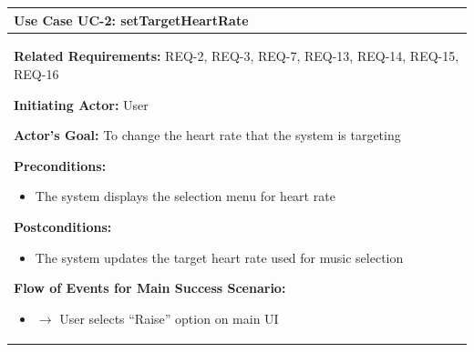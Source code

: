 \documentclass[letterpaper,english, 12pt]{scrreprt}
\begin{document}
\begin{center}
        \begin{tabular}{|C{15cm}|}
                \hline
                        \textbf{Use Case UC-2: setTargetHeartRate}\\
                \hline
                        \begin{flushleft}
                                \textbf{Related Requirements: } REQ-2, REQ-3, REQ-7, REQ-13, REQ-14, REQ-15, REQ-16
                        \end{flushleft}
                        \begin{flushleft}
                                \textbf{Initiating Actor: } User
                        \end{flushleft}
                        \begin{flushleft}
                                \textbf{Actor's Goal: } To change the heart rate that the system is targeting
                        \end{flushleft}
                        \begin{flushleft}
                                \textbf{Preconditions: }
                        \end{flushleft}
                                \begin{itemize}
                                        \item The system displays the selection menu for heart rate
                                \end{itemize}
                        \begin{flushleft}
                                \textbf{Postconditions: }
                        \end{flushleft}
                                \begin{itemize}
                                        \item The system updates the target heart rate used for music selection
                                \end{itemize}
                        \begin{flushleft}
                                \textbf{Flow of Events for Main Success Scenario: }
                        \end{flushleft}
                                \begin{itemize}
                                        \item[] $\rightarrow$ User selects ``Raise'' option on main UI

\end{itemize}
\end{tabular}
\end{center}
\end{document}
